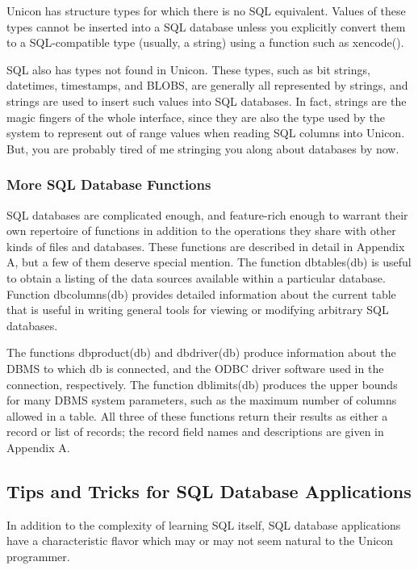 Unicon has structure types for which there is no SQL equivalent. Values
of these types cannot be inserted into a SQL database unless you
explicitly convert them to a SQL-compatible type (usually, a string)
using a function such as \textsf{xencode()}.

SQL also has types not found in Unicon. These types, such as bit
strings, datetimes, timestamps, and BLOBS, are generally all
represented by strings, and strings are used to insert such values into
SQL databases. In fact, strings are the {\textquotedbl}magic
fingers{\textquotedbl} of the whole interface, since they are also the
type used by the system to represent out of range values when reading
SQL columns into Unicon. But, you are probably tired of me stringing
you along about databases by now.

\subsubsection{More SQL Database Functions}

SQL databases are complicated enough, and feature-rich enough to warrant
their own repertoire of functions in addition to the operations they
share with other kinds of files and databases. These functions are
described in detail in Appendix A, but a few of them deserve special
mention. The function \textsf{dbtables(db)} is useful to obtain a
listing of the data sources available within a particular database.
Function \textsf{dbcolumns(db)} provides detailed information about the
current table that is useful in writing general tools for viewing or
modifying arbitrary SQL databases.

The functions \textsf{dbproduct(db)} and \textsf{dbdriver(db)} produce
information about the DBMS to which db is connected, and the
ODBC driver software used in the connection, respectively.
The function \textsf{dblimits(db)} produces the upper bounds for many
DBMS system parameters, such as the maximum number of columns allowed
in a table. All three of these functions return their results as either
a record or list of records; the record field names and descriptions
are given in Appendix A.

\subsection{Tips and Tricks for SQL Database Applications}

In addition to the complexity of learning SQL itself, SQL database
applications have a characteristic flavor which may or may not seem
natural to the Unicon programmer.

